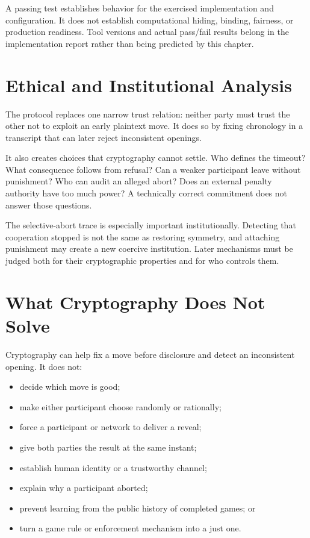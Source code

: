 A passing test establishes behavior for the exercised implementation and
configuration. It does not establish computational hiding, binding, fairness,
or production readiness. Tool versions and actual pass/fail results belong in
the implementation report rather than being predicted by this chapter.

\section{Ethical and Institutional Analysis}

The protocol replaces one narrow trust relation: neither party must trust the
other not to exploit an early plaintext move. It does so by fixing chronology
in a transcript that can later reject inconsistent openings.

It also creates choices that cryptography cannot settle. Who defines the
timeout? What consequence follows from refusal? Can a weaker participant
leave without punishment? Who can audit an alleged abort? Does an external
penalty authority have too much power? A technically correct commitment does
not answer those questions.

The selective-abort trace is especially important institutionally. Detecting
that cooperation stopped is not the same as restoring symmetry, and attaching
punishment may create a new coercive institution. Later mechanisms must be
judged both for their cryptographic properties and for who controls them.

\section{What Cryptography Does Not Solve}

Cryptography can help fix a move before disclosure and detect an inconsistent
opening. It does not:

\begin{itemize}
    \item decide which move is good;
    \item make either participant choose randomly or rationally;
    \item force a participant or network to deliver a reveal;
    \item give both parties the result at the same instant;
    \item establish human identity or a trustworthy channel;
    \item explain why a participant aborted;
    \item prevent learning from the public history of completed games; or
    \item turn a game rule or enforcement mechanism into a just one.
\end{itemize}


